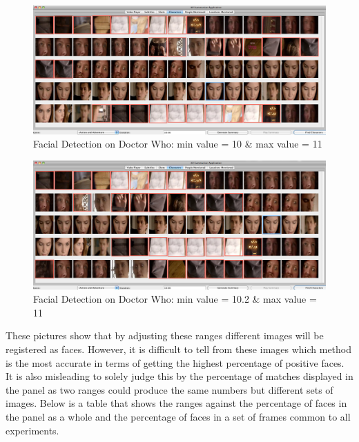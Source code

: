 \begin{figure}[h1]
\begin{center}
 \includegraphics[trim = 0mm 0mm 0mm 0mm, clip,
 scale=0.19]{Images/tentoeleven.png}
  \caption{Facial Detection on Doctor Who: min value = 10 \& max value = 11}
 \end{center}
\end{figure}

\newpage

\begin{figure}[h1]
\begin{center}
 \includegraphics[trim = 0mm 0mm 0mm 0mm, clip,
 scale=0.19]{Images/tenpointtotoeleven.png}
  \caption{Facial Detection on Doctor Who: min value = 10.2 \& max value = 11}
 \end{center}
\end{figure}

These pictures show that by adjusting these ranges different images will be registered as faces. However, it is difficult to tell from these images which method is the most accurate in terms of getting the highest percentage of positive faces. It is also misleading to solely judge this by the percentage of matches displayed in the panel as two ranges could produce the same numbers but different sets of images. Below is a table that shows the ranges against the percentage of faces in the panel as a whole and the percentage of faces in a set of frames common to all experiments. 

